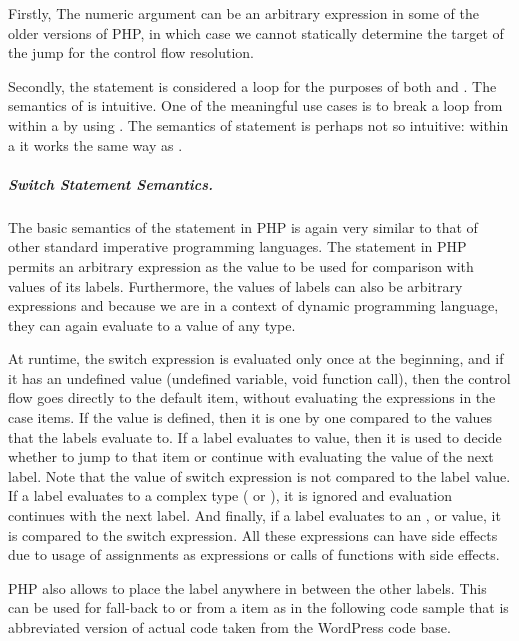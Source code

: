     Firstly, The numeric argument can be an arbitrary 
    expression in some of the older versions of PHP, in which 
    case we cannot statically determine the target of 
    the jump for the control flow resolution.
    
    Secondly, the  statement is considered 
    a loop for the purposes of both  and 
    . The semantics of  
    is intuitive. One of the meaningful use cases is to 
    break a loop from within a  by 
    using . The semantics of 
     statement 
    is perhaps not so intuitive: within a  
    it works the same way as .
    
    \subparagraph*{Switch Statement Semantics.} 
    The basic semantics of the  statement in PHP is 
    again very similar to that of other standard imperative 
    programming languages. The  statement in PHP 
    permits an arbitrary expression as the value to be used 
    for comparison with values of its  labels. Furthermore, 
    the values of  labels can also be arbitrary 
    expressions and because we are in a context of dynamic 
    programming language, they can again evaluate to a value 
    of any type.
    
    At runtime, the switch expression is evaluated only once 
    at the beginning, and if it has an undefined value (undefined variable, 
    void function call), then the control flow goes directly 
    to the default item, without evaluating the expressions 
    in the case items. If the value is defined, then it is 
    one by one compared to the values that the 
     labels evaluate to. If a  label evaluates 
    to  value, then it is used to decide whether to 
    jump to that  item or continue with evaluating 
    the value of the next  label. Note that the value of 
    switch expression is not compared to the  label value. 
    If a  label evaluates to a complex type ( or ), 
    it is ignored and evaluation continues with the next  label. 
    And finally, if a  label evaluates to an 
    ,  or  value, it is 
    compared to the switch expression. All these expressions can 
    have side effects due to usage of assignments as expressions 
    or calls of functions with side effects. 
    
    PHP also allows to place the  label anywhere in between 
    the other  labels. This can be used for fall-back 
    to or from a  item as in the following code sample 
    that is abbreviated version of actual code taken from the 
    WordPress\cite{wordpress} code base.
    
